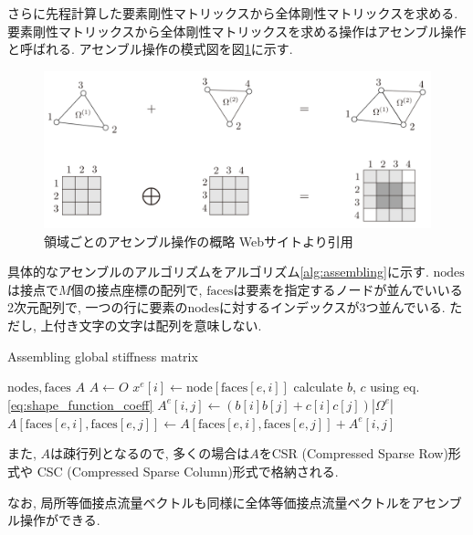 \documentclass{ltjsarticle}
\begin{document}
さらに先程計算した要素剛性マトリックスから全体剛性マトリックスを求める.
要素剛性マトリックスから全体剛性マトリックスを求める操作はアセンブル操作と呼ばれる.
アセンブル操作の模式図を図\ref{fig:assembling}に示す.
\begin{figure}[htbp]
    \centering
    \includegraphics[width=12cm]{assembling.png}
    \caption{領域ごとのアセンブル操作の概略  Webサイト\cite{Morita2018}より引用}
    \label{fig:assembling}
\end{figure}
具体的なアセンブルのアルゴリズムをアルゴリズム\ref{alg:assembling}に示す.
$\mathrm{nodes}$は接点で$M$個の接点座標の配列で,
$\mathrm{faces}$は要素を指定するノードが並んでいいる2次元配列で,
一つの行に要素の$\mathrm{nodes}$に対するインデックスが3つ並んでいる.
ただし, 上付き文字の文字は配列を意味しない.
\begin{algorithm}
    \caption{Assembling global stiffness matrix}
    \label{alg:assembling}
    \begin{algorithmic}
        \Require $\mathrm{nodes}, \mathrm{faces}$
        \Ensure $A$
        \State $A \leftarrow O$
                \State $x^e[i]\leftarrow \mathrm{node}[\mathrm{faces}[e, i]]$    
            \EndFor
            \State calculate $b$, $c$ using eq. \eqref{eq:shape_function_coeff}
                \State $A^e[i,j] \leftarrow (b[i]b[j]+c[i]c[j])|\Omega^e|$
            \EndFor 
                \State $A[\mathrm{faces}[e,i],\mathrm{faces}[e,j]] \leftarrow A[\mathrm{faces}[e,i],\mathrm{faces}[e,j]] + A^e[i,j]$
            \EndFor
        \EndFor
    \end{algorithmic}
\end{algorithm}
また, $A$は疎行列となるので, 多くの場合は$A$をCSR (Compressed Sparse Row)形式や
CSC (Compressed Sparse Column)形式で格納される.

なお, 局所等価接点流量ベクトルも同様に全体等価接点流量ベクトルをアセンブル操作ができる.
\end{document}
